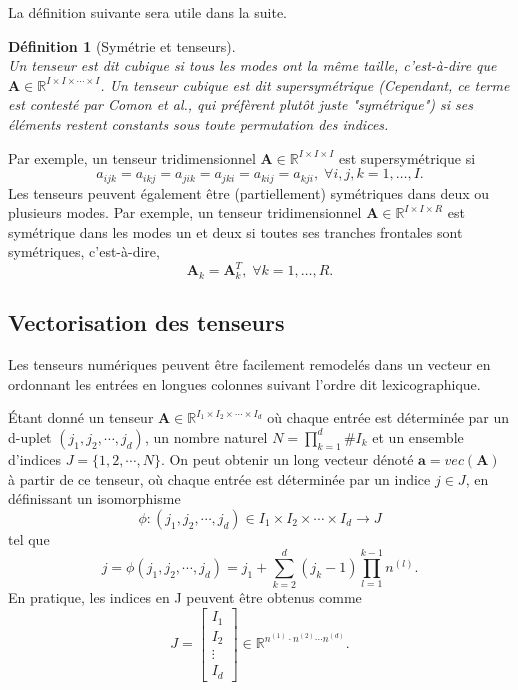 \documentclass[11pt,a4paper,oneside]{book}
\newtheorem{defi}{Définition}[chapter]
\def\R{\mathbb R}
\newcommand{\mbf}[1]{\mathbf{#1}}
\begin{document}
La définition suivante sera utile dans la suite.
\begin{defi}[Symétrie et tenseurs]\label{tensorsymdef}
	\emph{\\}
 Un tenseur est dit cubique si tous les modes ont la même taille, c'est-à-dire que $ \mbf{A}\in\R^{I\times I\times\cdots\times I} $. Un tenseur cubique est dit supersymétrique (Cependant, ce terme est contesté par Comon et al., qui préfèrent plutôt juste "symétrique") si ses éléments restent constants sous toute permutation des indices. 
\end{defi}
Par exemple, un tenseur tridimensionnel $ \mbf{A}\in\R^{I\times I\times I} $ est supersymétrique si 
\begin{equation}
a_{ijk}=a_{ikj}=a_{jik}=a_{jki}=a_{kij}=a_{kji},\;\forall i,j,k=1,\ldots,I.
\end{equation}
Les tenseurs peuvent également être (partiellement) symétriques dans deux ou plusieurs modes. Par exemple, un tenseur  tridimensionnel $ \mbf{A}\in\R^{I\times I\times R} $  est symétrique dans les modes un et deux si toutes ses tranches frontales sont symétriques, c'est-à-dire, $$\mbf{A}_{k}=\mbf{A}_{k}^{T},\;\forall k=1,\ldots,R.$$
\subsection{Vectorisation des tenseurs}
Les tenseurs numériques peuvent être facilement remodelés dans un vecteur en ordonnant les entrées en longues colonnes suivant l'ordre dit lexicographique.

Étant donné un tenseur $ \mathbf{A} \in \R^{I_{1}\times I_{2}\times\cdots\times I_{d}} $ où chaque entrée est déterminée par un d-uplet $\left( j_{1},j_{2},\cdots,j_{d}\right) $, un nombre naturel $ N=\prod_{k=1}^{d}\# I_{k} $ et un ensemble d'indices $ J=\{1,2,\cdots,N\} $. On peut obtenir un long vecteur dénoté $ \mathbf{a} =vec(\mbf{A})$ à partir de ce tenseur, où chaque entrée est déterminée par un indice $ j\in J $, en définissant un isomorphisme \cite[p.158]{hackbusch2012tensor} $$ \phi :\left(j_{1},j_{2},\cdots,j_{d}\right)\in I_{1}\times I_{2}\times\cdots\times I_{d}\longrightarrow J $$ tel que 
\begin{equation}\label{5.6}
j=\phi\left(j_{1},j_{2},\cdots,j_{d}\right) =j_{1}+\sum_{k=2}^{d}\left(j_{k}-1\right)\prod_{l=1}^{k-1}n^{(l)}.
\end{equation}
En pratique, les indices en J peuvent être obtenus comme 
\begin{equation*}
J=\begin{bmatrix}
I_{1}\\
I_{2}\\
\vdots\\
I_{d}
\end{bmatrix}\in \R^{n^{(1)}\cdot n^{(2)}\cdots n^{(d)}}.
\end{equation*}
\end{document}
